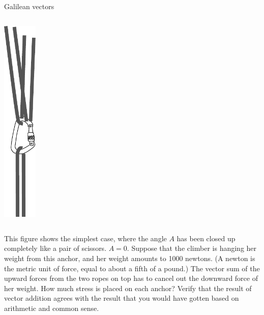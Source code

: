 \begin{frame}{Galilean vectors}


  \begin{mycolumns}


    \begin{column}{.2\textwidth}\includegraphics[width=0.65in]{ch04/figs/anchor-2}\end{column}

    \begin{column}{.8\textwidth}

    This figure shows the simplest case, where the angle $A$ has been closed up completely like a pair of
    scissors. $A=0$.
      Suppose that the climber is hanging her weight from this anchor, and her weight amounts to 1000 newtons.
      (A newton is the metric unit of force, equal to about a fifth of a pound.) The vector sum of the upward
      forces from the two ropes on top has to cancel out the downward force of her weight. How much stress is
      placed on each anchor? Verify that the result of vector addition agrees with the result that you would
      have gotten based on arithmetic and common sense.

    \end{column}
  \end{mycolumns}

\end{frame}

